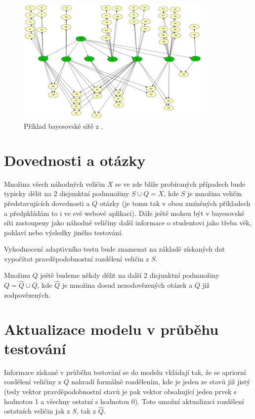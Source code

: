 \documentclass[a4paper,twoside,12pt]{book}
\begin{document}
\begin{figure}
  \centering
    \includegraphics[width=0.85\textwidth]{complex_BN_plajner16.pdf}
  \caption{Příklad bayesovské síťě z \cite{plajner16}.}
  \label{fig:complex_BN_plajner16}
\end{figure}

\section{Dovednosti a otázky}
Množina všech náhodných veličin $X$ se ve zde blíže probíraných případech bude typicky dělit na 2 disjunktní podmnožiny $S \cup Q = X$, kde $S$ je množina veličin představujících dovednosti a $Q$ otázky (je tomu tak v obou zmíněných příkladech a předpkládám to i ve své webové aplikaci). Dále ještě mohou být v bayesovské síti zastoupeny jako náhodné veličiny další informace o studentovi jako třeba věk, pohlaví nebo výsledky jiného testování.

Vyhodnocení adaptivního testu bude znamenat na základě získaných dat vypočítat pravděpodobnostní rozdělení veličin z $S$.

Množinu $Q$ ještě budeme někdy dělit na další 2 disjunktní podmnožiny $Q = \widehat{Q} \cup \overline{Q}$, kde $\widehat{Q}$ je množina dosud nezodovězených otázek a $\overline{Q}$ již zodpovězených.

\section{Aktualizace modelu v průběhu testování}
Informace získané v průběhu testování se do modelu vkládají tak, že se apriorní rozdělení veličiny z $Q$ nahradí formálně rozdělením, kde je jeden ze stavů již jistý (tedy vektor pravděpodobnostní stavů je pak vektor obsahující jeden prvek s hodnotou 1 a všechny ostatní s hodnotou 0). Toto umožní aktualizaci rozdělení ostatních veličin jak z $S$, tak z $\widehat{Q}$.
\end{document}
